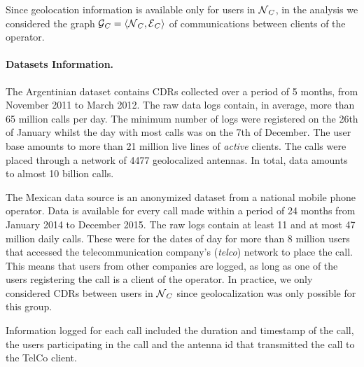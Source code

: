 Since geolocation information is available only for users in $\operatorname{\mathcal{N}}_C$, in the analysis we considered the graph $\operatorname{\mathcal{G}}_C = \left< \operatorname{\mathcal{N}}_C, \operatorname{\mathcal{E}}_C \right> $ of communications between clients of the operator.

\paragraph{Datasets Information.}

The Argentinian dataset contains CDRs collected over a period of 5 months, from November 2011 to March 2012. The raw data logs contain, in average, more than 65 million calls per day. The minimum number of logs were registered on the 26th of January whilst the day with most calls was on the 7th of December.  The user base amounts to more than 21 million live lines of \textit{active} clients. The calls were placed through a network of 4477 geolocalized antennas. In total, data amounts to almost 10 billion calls. 

The Mexican data source is an anonymized dataset from a national mobile phone operator. Data is available for every call made within a period of 24 months from January 2014 to December 2015. The raw logs contain at least 11 and at most 47 million daily calls. These were for the dates of   day for more than 8 million users that accessed the telecommunication company's (\textit{telco}) network to place the call. This means that users from other companies are logged, as long as one of the users registering the call is a client of the operator. In practice, we only considered CDRs between users in $\operatorname{\mathcal{N}}_C$ since geolocalization was only possible for this group.

Information logged for each call included the duration and timestamp of the call, the users participating in the call and the antenna id that transmitted the call to the TelCo client. 


